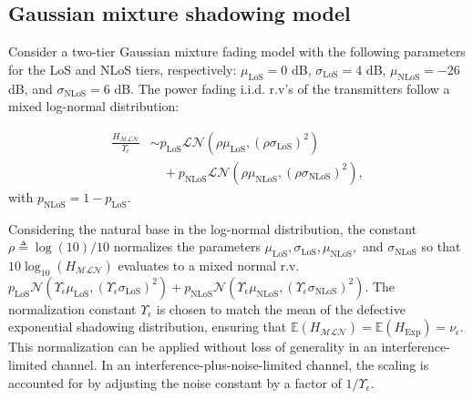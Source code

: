 \documentclass[lettersize,journal]{IEEEtran}
\begin{document}
\subsection{Gaussian mixture shadowing model}

Consider a two-tier Gaussian mixture fading model with the following parameters for the LoS and NLoS tiers, respectively: $\mu_{\text{LoS}} = 0$ dB, $\sigma_{\text{LoS}} = 4$ dB, $\mu_{\text{NLoS}} = -26$ dB, and $\sigma_{\text{NLoS}} = 6$ dB. The power fading i.i.d. r.v's of the transmitters follow a mixed log-normal distribution:

\begin{align}
  \label{eq:tier2lognormal}
  \frac{H_{\mathcal{M}\mathcal{L}\mathcal{N}}}{\Upsilon_{\epsilon}} &\sim p_{\text{LoS}} \mathcal{L}\mathcal{N}(\rho \mu_{\text{LoS}}, (\rho \sigma_{\text{LoS}})^2) \nonumber \\
  &\quad + p_{\text{NLoS}} \mathcal{L}\mathcal{N}(\rho \mu_{\text{NLoS}}, (\rho \sigma_{\text{NLoS}})^2),
\end{align}
with $p_{\text{NLoS}} = 1 - p_{\text{LoS}}$.

Considering the natural base in the log-normal distribution, the constant $\rho \triangleq \log(10)/10$ normalizes the parameters $\mu_{\text{LoS}}, \sigma_{\text{LoS}}, \mu_{\text{NLoS}},$ and $\sigma_{\text{NLoS}}$ so that $10 \log_{10}(H_{\mathcal{M}\mathcal{L} \mathcal{N}})$ evaluates to a mixed normal r.v. $p_{\text{LoS}} \mathcal{N}(\Upsilon_{\epsilon}\mu_{\text{LoS}}, (\Upsilon_{\epsilon}\sigma_{\text{LoS}})^2) + p_{\text{NLoS}} \mathcal{N}(\Upsilon_{\epsilon} \mu_{\text{NLoS}}, (\Upsilon_{\epsilon}\sigma_{\text{NLoS}})^2)$. The normalization constant $\Upsilon_{\epsilon}$ is chosen to match the mean of the defective exponential shadowing distribution, ensuring that $\mathbb{E}(H_{\mathcal{M}\mathcal{L}\mathcal{N}}) = \mathbb{E}(H_{\text{Exp}}) = \nu_{\epsilon}$. This normalization can be applied without loss of generality in an interference-limited channel. In an interference-plus-noise-limited channel, the scaling is accounted for by adjusting the noise constant by a factor of $1/\Upsilon_{\epsilon}$.
\end{document}
